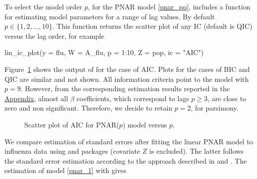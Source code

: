 
To select the model order $p$, for the PNAR model \eqref{pnar_pq},   includes a function  for estimating model parameters 
for a range of lag values. By  default $p\in \{1,2,\dots,10\}$. This function  returns the scatter plot of any IC (default is QIC) versus the lag order, for example 
\begin{example}
	lin_ic_plot(y = flu, W = A_flu, p = 1:10, Z = pop, ic = "AIC")
\end{example}
Figure~\ref{ic} shows the output of  for the case of AIC. Plots for the cases of BIC and QIC are similar and not shown. All information criteria  point to the model with $p=9$. However, from the corresponding estimation results reported in the \hyperref[SEC: appendix]{Appendix}, almost all $\beta$ coefficients, which correspond to lags $p \geq 3$, are close to zero and non significant. Therefore, we decide to retain $p=2$, for parsimony. 

\begin{figure}[h]
	\centering
	\caption{Scatter plot of AIC for PNAR($p$) model versus $p$.}
	\label{ic}
\end{figure}

We compare  estimation of standard errors after fitting the linear PNAR model to influenza data using  and  packages (covariate $Z$ is excluded). The latter follows the standard error estimation according to the approach described in \cite{paul_etal_2008} and \cite{paul_etal_2011}.
The estimation of model \eqref{pnar_1} with  gives 

